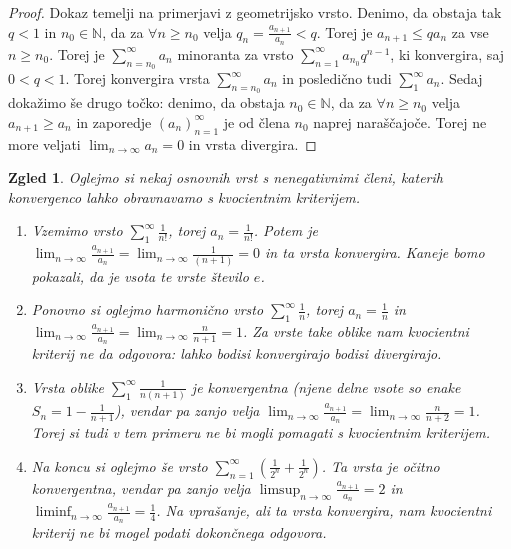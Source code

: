 \documentclass[10pt, a4paper]{article}
\newtheorem{zgled}[izr]{Zgled}
\newenvironment{noticeC}{%
  \tcolorbox[%
  notitle,
  empty,
  enhanced,  %
  breakable,
  coltext=black, 
  fontupper=\rmfamily,
  noparskip,
  sharp corners,
  boxrule=-1pt,  %
  frame hidden,
  left=7pt,  %
  right=7pt,
  top=5pt,
  bottom=5pt,
  before skip=2.5ex plus 2pt,
  after skip=2.5ex plus 2pt,
  overlay unbroken and last={%
  },
  ]}
{\endtcolorbox}
\newenvironment{dokaz}%
  {\begin{noticeC}\begin{proof}}%
  {\end{proof}\end{noticeC}}
\newcommand{\N}{\mathbb {N}}
\newcommand{\zap}[1]{(#1_n)_{n=1} ^{\infty}}
\newcommand{\limzap}[1]{\lim_{n \to \infty} {#1}}
\begin{document}
\begin{dokaz}
    Dokaz temelji na primerjavi z geometrijsko vrsto.
    Denimo, da obstaja tak $q <1$ in $n_0 \in \N$, da za $\forall n \geq n_0$ velja
    $q_n = \frac{a_{n+1}}{a_n} < q$. Torej je $a_{n+1} \leq q a_n$ za vse $n \geq n_0$.
    Torej je $\sum_{n= n_0} ^\infty a_n$ minoranta za vrsto $\sum_{n=1} ^\infty a_{n_0} q^{n-1}$, ki konvergira, saj $0 < q < 1$.
    Torej konvergira vrsta $\sum_{n= n_0} ^\infty a_n$ in posledično tudi $\sum_{1} ^\infty a_n$.
    Sedaj dokažimo še drugo točko: denimo, da obstaja $n_0 \in \N$, da za $\forall n \geq n_0$ velja $a_{n+1} \geq a_n$ in zaporedje $\zap{a}$ je od člena $n_0$ naprej naraščajoče.
    Torej ne more veljati $\limzap{a_n} = 0$ in vrsta divergira. 
\end{dokaz}

\begin{zgled}
    Oglejmo si nekaj osnovnih vrst s nenegativnimi členi, katerih konvergenco lahko obravnavamo s kvocientnim kriterijem.
    \begin{enumerate}
        \item Vzemimo vrsto $\sum_1 ^\infty \frac{1}{n!}$, torej $a_n = \frac{1}{n!}$.
        Potem je $\limzap{\frac{a_{n+1}}{a_n}} = \limzap{\frac{1}{(n+1)}} = 0$ in ta vrsta konvergira.
        Kaneje bomo pokazali, da je vsota te vrste število $e$.
        \item Ponovno si oglejmo harmonično vrsto $\sum_1 ^\infty \frac{1}{n}$, torej $a_n = \frac{1}{n}$ in 
        $\limzap{\frac{a_{n+1}}{a_n}} = \limzap{\frac{n}{n+1}} = 1$.
        Za vrste take oblike nam kvocientni kriterij ne da odgovora: lahko bodisi konvergirajo bodisi divergirajo.
        \item Vrsta oblike $\sum_1 ^\infty \frac{1}{n(n+1)}$ je konvergentna (njene delne vsote so enake $S_n = 1 - \frac{1}{n+1}$), 
        vendar pa zanjo velja $\limzap{\frac{a_{n+1}}{a_n}} = \limzap{\frac{n}{n+2}} = 1$. Torej si tudi v tem primeru ne bi mogli pomagati s kvocientnim kriterijem. 
        \item Na koncu si oglejmo še vrsto $\sum_{n=1} ^\infty \left(\frac{1}{2^n} + \frac{1}{2^n}\right)$.
        Ta vrsta je očitno konvergentna, vendar pa zanjo velja $\limsup_{n \to \infty} \frac{a_{n+1}}{a_n} = 2$ in $\liminf_{n \to \infty} \frac{a_{n+1}}{a_n} = \frac{1}{4}$.
        Na vprašanje, ali ta vrsta konvergira, nam kvocientni kriterij ne bi mogel podati dokončnega odgovora.
    \end{enumerate}
\end{zgled}
\end{document}
